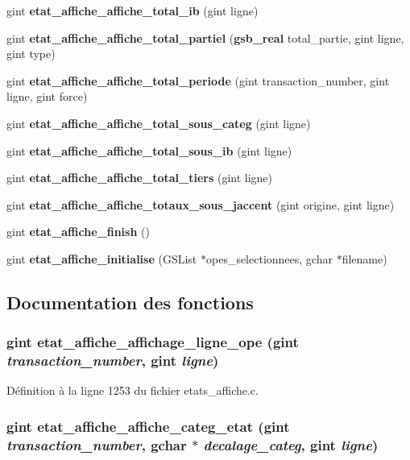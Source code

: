 \begin{DoxyCompactItemize}
\item 
gint {\bf etat\_\-affiche\_\-affiche\_\-total\_\-ib} (gint ligne)
\item 
gint {\bf etat\_\-affiche\_\-affiche\_\-total\_\-partiel} ({\bf gsb\_\-real} total\_\-partie, gint ligne, gint type)
\item 
gint {\bf etat\_\-affiche\_\-affiche\_\-total\_\-periode} (gint transaction\_\-number, gint ligne, gint force)
\item 
gint {\bf etat\_\-affiche\_\-affiche\_\-total\_\-sous\_\-categ} (gint ligne)
\item 
gint {\bf etat\_\-affiche\_\-affiche\_\-total\_\-sous\_\-ib} (gint ligne)
\item 
gint {\bf etat\_\-affiche\_\-affiche\_\-total\_\-tiers} (gint ligne)
\item 
gint {\bf etat\_\-affiche\_\-affiche\_\-totaux\_\-sous\_\-jaccent} (gint origine, gint ligne)
\item 
gint {\bf etat\_\-affiche\_\-finish} ()
\item 
gint {\bf etat\_\-affiche\_\-initialise} (GSList $\ast$opes\_\-selectionnees, gchar $\ast$filename)
\end{DoxyCompactItemize}


\subsection{Documentation des fonctions}
\subsubsection[{etat\_\-affiche\_\-affichage\_\-ligne\_\-ope}]{\setlength{\rightskip}{0pt plus 5cm}gint etat\_\-affiche\_\-affichage\_\-ligne\_\-ope (gint {\em transaction\_\-number}, \/  gint {\em ligne})}\label{etats__affiche_8h_ab00e4fcfeb69f01dd1447564693e1887}


Définition à la ligne 1253 du fichier etats\_\-affiche.c.

\subsubsection[{etat\_\-affiche\_\-affiche\_\-categ\_\-etat}]{\setlength{\rightskip}{0pt plus 5cm}gint etat\_\-affiche\_\-affiche\_\-categ\_\-etat (gint {\em transaction\_\-number}, \/  gchar $\ast$ {\em decalage\_\-categ}, \/  gint {\em ligne})}\label{etats__affiche_8h_a466c2f771970489a9816c9e11732f662}


